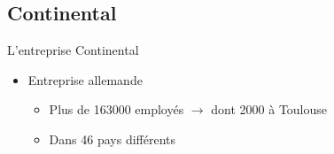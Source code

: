 \documentclass{beamer}
\begin{document}
\subsection{Continental}
\begin{frame}{L'entreprise Continental}

	\begin{itemize}[<+->]
		\item Entreprise allemande
			\begin{itemize}
				\item Plus de 163000 employés\newline
				$\rightarrow$ dont 2000 à Toulouse
				\item Dans 46 pays différents
			\end{itemize}
			\vfill	
	\end{itemize}
\end{frame}
\end{document}
